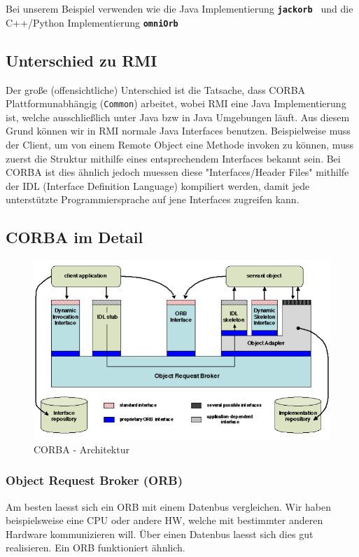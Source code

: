 		Bei unserem Beispiel verwenden wie die Java Implementierung \textbf{\texttt{jackorb \cite{jackorb}}} und die C++/Python Implementierung \textbf{\texttt{omniOrb \cite{omniOrb}}}
		
		\clearpage
		
		\subsection{Unterschied zu RMI \cite{corbaPDF}}
		Der große (offensichtliche) Unterschied ist die Tatsache, dass CORBA Plattformunabhängig (\texttt{Common}) arbeitet, wobei RMI eine Java Implementierung ist, welche ausschließlich unter Java bzw in Java Umgebungen läuft. 
		Aus diesem Grund können wir in RMI normale Java Interfaces benutzen. Beispielweise muss der Client, um von einem Remote Object eine Methode invoken zu können, muss zuerst die Struktur mithilfe eines entsprechendem Interfaces bekannt sein. Bei CORBA ist dies ähnlich jedoch muessen diese "Interfaces/Header Files" mithilfe der IDL (Interface Definition Language) kompiliert werden, damit jede unterstützte Programmiersprache auf jene Interfaces zugreifen kann.
		
		\subsection{CORBA im Detail \cite{corbaPDF}}
		\begin{figure}[!h]
			\begin{center}
				\includegraphics[width=0.6\linewidth]{images/corbaArchitektur.png}
				\caption{CORBA - Architektur \cite{corbaArchitektur}}
				\label{Decorator Pattern - Klassen Diagramm}
			\end{center}
		\end{figure}
		
			\subsubsection{Object Request Broker (ORB) \cite{corbaPDF}}
			Am besten laesst sich ein ORB mit einem Datenbus vergleichen. Wir haben beispielsweise eine CPU oder andere HW, welche mit bestimmter anderen Hardware kommunizieren will. Über einen Datenbus laesst sich dies gut realisieren. Ein ORB funktioniert ähnlich.
			

